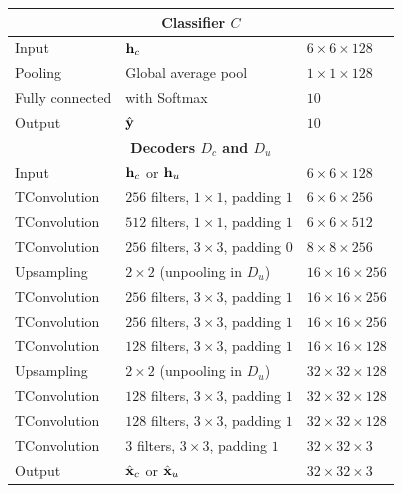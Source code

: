 \begin{table}[p]
\begin{tabular}{ l l l}
  \toprule
  \multicolumn{3}{c}{\textbf{Classifier $C$}}\\
  \midrule
  Input & $\mathbf{h}_c$& $6\times 6\times 128$ \\
  Pooling & Global average pool & $1\times 1\times 128$ \\
  Fully connected & with Softmax & $10$ \\
  Output & $\hat{\mathbf{y}}$ & $10$ \\
  \toprule
  \multicolumn{3}{c}{\textbf{Decoders $D_c$ and $D_u$}}\\
  \midrule
  Input & $\mathbf{h}_c$ or $\mathbf{h}_u$ & $6\times 6\times 128$ \\
  TConvolution & $256$ filters, $1\times1$, padding $1$  & $6\times 6\times 256$ \\
  TConvolution & $512$ filters, $1\times1$, padding $1$  & $6\times 6\times 512$ \\
  TConvolution & $256$ filters, $3\times3$, padding $0$  & $8\times 8\times 256$ \\
  Upsampling   & $2\times2$ (unpooling in $D_u$)  & $16\times 16\times 256$ \\
  TConvolution & $256$ filters, $3\times3$, padding $1$ & $16\times 16\times 256$ \\
  TConvolution & $256$ filters, $3\times3$, padding $1$ & $16\times 16\times 256$ \\
  TConvolution & $128$ filters, $3\times3$, padding $1$ & $16\times 16\times 128$ \\
  Upsampling & $2\times2$ (unpooling in $D_u$) & $32\times 32\times 128$ \\
  TConvolution & $128$ filters, $3\times3$, padding $1$  & $32\times 32\times 128$ \\
  TConvolution & $128$ filters, $3\times3$, padding $1$  & $32\times 32\times 128$ \\
  TConvolution & $3$ filters, $3\times3$, padding $1$  & $32\times 32\times 3$ \\
  Output & $\hat{\mathbf{x}}_c$ or $\hat{\mathbf{x}}_u$ & $32\times 32 \times 3$ \\
  \bottomrule
  \end{tabular}
  \label{hybridnet:table:convlarge}
  \end{table}

